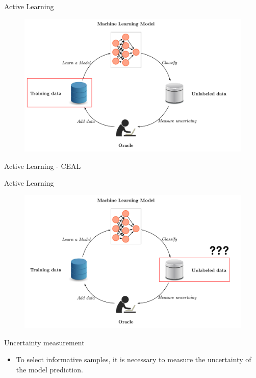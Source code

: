 \documentclass[10pt]{beamer}
\begin{document}
\begin{frame}[fragile]{Active Learning}
    \begin{figure}[htp]
        \centering
        \includegraphics[scale=0.3]{images/active_learning_labeled.png}
    \end{figure}
\end{frame}

\begin{frame}[fragile]{Active Learning - CEAL}
    
\end{frame}

\begin{frame}[fragile]{Active Learning}
    \begin{figure}[htp]
        \centering
        \includegraphics[scale=0.3]{images/active_learning_uncertainty.png}
    \end{figure}
\end{frame}

\begin{frame}[fragile]{Uncertainty measurement}
\begin{itemize}
\item To select informative samples, it is necessary to measure the
    \alert{uncertainty} of the model prediction.
\end{itemize}
\end{frame}
\end{document}

